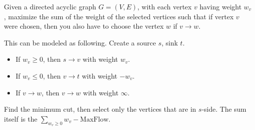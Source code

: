 Given a directed acyclic graph $G = (V, E)$, with each vertex $v$ having weight $w_v$,
maximize the sum of the weight of the selected vertices such that if vertex $v$ were chosen, then you also have to choose the vertex $w$ if $v \rightarrow w$.

This can be modeled as following. Create a source $s$, sink $t$.
\begin{itemize}
	\item If $w_v \ge 0$, then $s \to v$ with weight $w_v$.
	\item If $w_v \le 0$, then $v \to t$ with weight $-w_v$.
	\item If $v \to w$, then $v \to w$ with weight $\infty$.
\end{itemize}

Find the minimum cut, then select only the vertices that are in $s$-side.
The sum itself is the $\sum_{w_v \ge 0} w_v - \mathrm{MaxFlow}$.